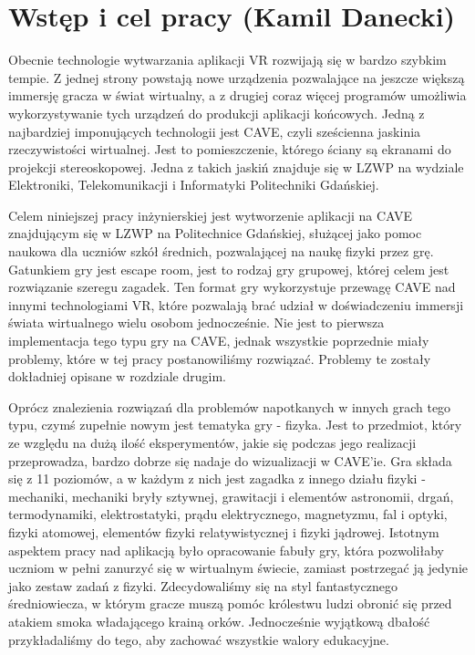 \chapter{Wstęp i cel pracy (Kamil Danecki)}
\label{chap:introduction}

Obecnie technologie wytwarzania aplikacji VR rozwijają się w bardzo szybkim tempie. 
Z jednej strony powstają nowe urządzenia pozwalające na jeszcze większą immersję gracza w świat wirtualny, a z drugiej coraz więcej programów umożliwia wykorzystywanie tych urządzeń do produkcji aplikacji końcowych.
Jedną z najbardziej imponujących technologii jest CAVE, czyli sześcienna jaskinia rzeczywistości wirtualnej. 
Jest to pomieszczenie, którego ściany są ekranami do projekcji stereoskopowej. \cite{cave_wiki} 
Jedna z takich jaskiń znajduje się w LZWP na wydziale Elektroniki, Telekomunikacji i Informatyki Politechniki Gdańskiej.

Celem niniejszej pracy inżynierskiej jest wytworzenie aplikacji na CAVE znajdującym się w LZWP na Politechnice Gdańskiej, służącej jako pomoc naukowa dla uczniów szkół średnich, pozwalającej na naukę fizyki przez grę. 
Gatunkiem gry jest escape room, jest to rodzaj gry grupowej, której celem jest rozwiązanie szeregu zagadek.
Ten format gry wykorzystuje przewagę CAVE nad innymi technologiami VR, które pozwalają brać udział w doświadczeniu immersji świata wirtualnego wielu osobom jednocześnie. 
Nie jest to pierwsza implementacja tego typu gry na CAVE, jednak wszystkie poprzednie miały problemy, które w tej pracy postanowiliśmy rozwiązać. 
Problemy te zostały dokładniej opisane w rozdziale drugim.

Oprócz znalezienia rozwiązań dla problemów napotkanych w innych grach tego typu, czymś zupełnie nowym jest tematyka gry - fizyka. Jest to przedmiot, który ze względu na dużą ilość eksperymentów, jakie się podczas jego realizacji przeprowadza, bardzo dobrze się nadaje do wizualizacji w CAVE'ie.
Gra składa się z 11 poziomów, a w każdym z nich jest zagadka z innego działu fizyki - mechaniki, mechaniki bryły sztywnej, grawitacji i elementów astronomii, drgań, termodynamiki, elektrostatyki, prądu elektrycznego, magnetyzmu, fal i optyki, fizyki atomowej, elementów fizyki relatywistycznej i fizyki jądrowej. 
Istotnym aspektem pracy nad aplikacją było opracowanie fabuły gry, która pozwoliłaby uczniom w pełni zanurzyć się w wirtualnym świecie, zamiast postrzegać ją jedynie jako zestaw zadań z fizyki.
Zdecydowaliśmy się na styl fantastycznego średniowiecza, w którym gracze muszą pomóc królestwu ludzi obronić się przed atakiem smoka władającego krainą orków.
Jednocześnie wyjątkową dbałość przykładaliśmy do tego, aby zachować wszystkie walory edukacyjne.

